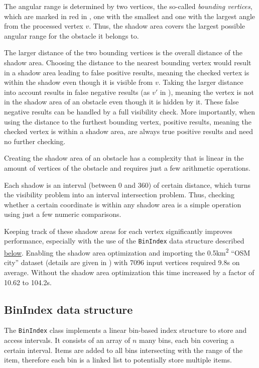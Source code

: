 		The angular range is determined by two vertices, the so-called \emph{bounding vertices}, which are marked in red in , one with the smallest and one with the largest angle from the processed vertex $v$.
		Thus, the shadow area covers the largest possible angular range for the obstacle it belongs to.
		
		The larger distance of the two bounding vertices is the overall distance of the shadow area.
		Choosing the distance to the nearest bounding vertex would result in a shadow area leading to false positive results, meaning the checked vertex is within the shadow even though it is visible from $v$.
		Taking the larger distance into account results in false negative results (as $v'$ in ), meaning the vertex is not in the shadow area of an obstacle even though it is hidden by it.
		These false negative results can be handled by a full visibility check.
		More importantly, when using the distance to the furthest bounding vertex, positive results, meaning the checked vertex is within a shadow area, are always true positive results and need no further checking.
		
		Creating the shadow area of an obstacle has a complexity that is linear in the amount of vertices of the obstacle and requires just a few arithmetic operations.
		
		
		Each shadow is an interval (between 0 and 360) of certain distance, which turns the visibility problem into an interval intersection problem.
		Thus, checking whether a certain coordinate is within any shadow area is a simple operation using just a few numeric comparisons.
		
		Keeping track of these shadow areas for each vertex significantly improves performance, especially with the use of the \texttt{BinIndex} data structure described \hyperref[subsec:binindex]{below}.
		Enabling the shadow area optimization and importing the 0.5km\textsuperscript{2} \enquote{OSM city} dataset (details are given in ) with 7096 input vertices required 9.8s on average.
		Without the shadow area optimization this time increased by a factor of 10.62 to 104.2s.

	\subsection{BinIndex data structure}
	\label{subsec:binindex}
	
		The \texttt{BinIndex} class implements a linear bin-based index structure to store and access intervals.
		It consists of an array of $n$ many bins, each bin covering a certain interval.
		Items are added to all bins intersecting with the range of the item, therefore each bin is a linked list to potentially store multiple items.
	
